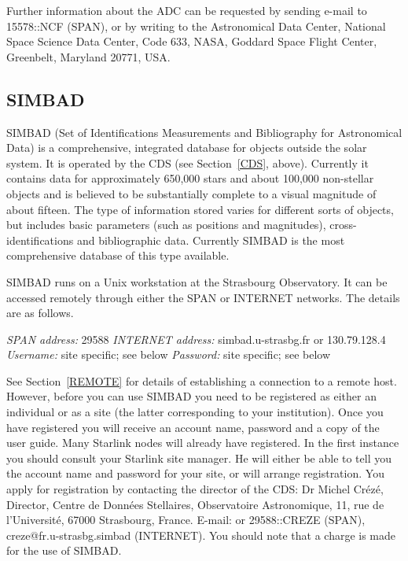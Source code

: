 \documentclass[twoside,11pt,nolof]{starlink}
\begin{document}
Further information about the ADC can be requested by sending e-mail
to 15578::NCF (SPAN), or by writing to the Astronomical Data Center,
National Space Science Data Center, Code 633, NASA, Goddard Space Flight
Center, Greenbelt, Maryland 20771, USA.

\subsection{SIMBAD}

SIMBAD (Set of Identifications Measurements and Bibliography for
Astronomical Data) is a comprehensive, integrated database for objects
outside the solar system. It is operated by the CDS (see
Section~\ref{CDS}, above). Currently it contains data for
approximately 650,000 stars and about 100,000 non-stellar objects and
is believed to be substantially complete to a visual magnitude of about
fifteen. The type of information stored varies for different sorts of
objects, but includes basic parameters (such as positions and
magnitudes), cross-identifications and bibliographic data. Currently
SIMBAD is the most comprehensive database of this type available.

SIMBAD runs on a Unix workstation at the Strasbourg Observatory. It
can be accessed remotely through either the SPAN or INTERNET networks.
The details are as follows.

\textit{SPAN address: } 29588
\newline \textit{INTERNET address:} simbad.u-strasbg.fr or 130.79.128.4
\newline \textit{Username:} site specific; see below
\newline \textit{Password:} site specific; see below

See Section~\ref{REMOTE} for details of establishing a connection to
a remote host. However, before you can use SIMBAD you need to be
registered as either an individual or as a site (the latter
corresponding to your institution). Once you have registered you will
receive an account name, password and a copy of the user guide. Many
Starlink nodes will already have registered. In the first instance you
should consult your Starlink site manager. He will either be able to
tell you the account name and password for your site, or will arrange
registration. You apply for registration by contacting the director of
the CDS: Dr Michel Cr\'{e}z\'{e}, Director, Centre de Donn\'{e}es
Stellaires, Observatoire Astronomique, 11, rue de l'Universit\'{e},
67000 Strasbourg, France. E-mail: or 29588::CREZE (SPAN),
creze@fr.u-strasbg.simbad (INTERNET). You should note that a charge is
made for the use of SIMBAD.
\end{document}
